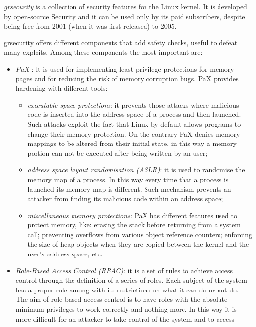 \documentclass[a4paper,12pt]{article}
\begin{document}
\textit{grsecurity} \cite{wiki_grsecurity} is a collection of security features
for the Linux kernel. It is developed by open-source Security and it can be used
only by its paid subscribers, despite being free from 2001 (when it was first
released) to 2005.\par grsecurity offers different components that add safety
checks, useful to defeat many exploits. Among these components the most
important are:
\begin{itemize}
  \item \textit{PaX} \cite{wiki_PAX}: It is used for implementing least
  privilege protections for memory pages and for reducing the risk of memory
  corruption bugs. PaX provides hardening with different tools: 
  \begin{itemize}
    \item \textit{executable space protections}: it prevents those attacks
    where malicious code is inserted into the address space of a process and
    then launched. Such attacks exploit the fact that Linux by default allows
    programs to change their memory protection. On the contrary PaX denies
    memory mappings to be altered from their initial state, in this way a memory
    portion can not be executed after being written by an user; 
    \item \textit{address space layout randomisation (ASLR)}: it is used to randomise the
    memory map of a process. In this way every time that a process is launched
    its memory map is different. Such mechanism prevents an attacker from
    finding its malicious code within an address space;
    \item \textit{miscellaneous memory protections}: PaX has different features used to
    protect memory, like: erasing the stack before returning from a system call;
    preventing overflows from various object reference counters; enforcing  the
    size of heap objects when they are copied between the kernel and the
    user's address space; etc. 
  \end{itemize}
  \item \textit{Role-Based Access Control (RBAC)}: it is a set of rules to achieve access
  control through the definition of a series of roles. Each subject of the
  system has a proper role among with its restrictions on what it can do or not
  do. The aim of role-based access control is to have roles with the absolute
  minimum privileges to work correctly and nothing more. In this way it is more
  difficult for an attacker to take control of the system and to access

\end{itemize}
\end{document}
